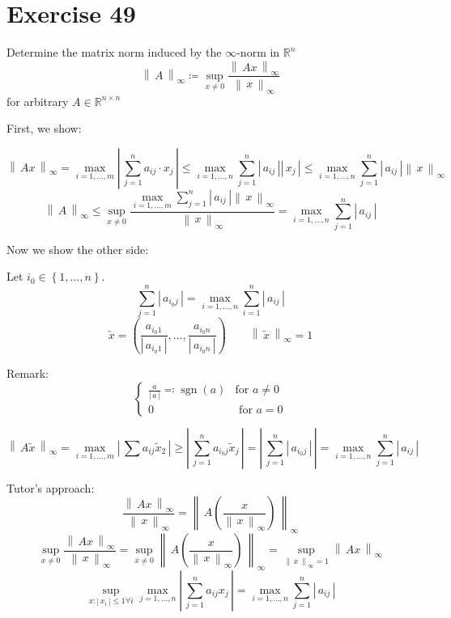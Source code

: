 \documentclass[a4paper]{article}
\theoremstyle{definition}
\newcommand\abs[1]{\left|\,#1\,\right|}
\newcommand\norm[1]{\left\|\,#1\,\right\|}
\newcommand\set[1]{\left\{#1\right\}}
\begin{document}
\section{Exercise 49}
\begin{ex}
  Determine the matrix norm induced by the $\infty$-norm in $\mathbb R^n$
  \[
  \norm{A}_\infty \coloneqq \sup_{x \neq 0} \frac{\norm{Ax}_\infty}{\norm{x}_\infty}
  \]
  for arbitrary $A \in \mathbb R^{n\times n}$
\end{ex}

First, we show:

\[
  \norm{Ax}_\infty = \max_{i = 1, \ldots, m} \abs{\sum_{j=1}^n a_{ij} \cdot x_j}
  \leq \max_{i=1,\ldots,n} \sum_{j=1}^n \abs{a_{ij}} \abs{x_j}
  \leq \max_{i=1,\ldots,n} \sum_{j=1}^n \abs{a_{ij}} \norm{x}_\infty
\]
\[ \norm{A}_\infty \leq \sup_{x\neq 0} \frac{\max_{i=1,\ldots,m} \sum_{j=1}^n \abs{a_{ij}} \norm{x}_\infty}{\norm{x}_\infty} = \max_{i=1,\ldots,n} \sum_{j=1}^n \abs{a_{ij}} \]

Now we show the other side:

Let $i_0 \in \set{1,\ldots,n}$.
\[ \sum_{j=1}^n \abs{a_{i_0 j}} = \max_{i=1,\ldots,n} \sum_{i=1}^n \abs{a_{ij}} \]
\[ \tilde{x} = \left(\frac{a_{i_0 1}}{\abs{a_{i_0 1}}}, \ldots, \frac{a_{i_0 n}}{\abs{a_{i_0 n}}}\right) \qquad \norm{\tilde{x}}_\infty = 1\]

Remark:
\[
\begin{cases}
  \frac{a}{\abs{a}} \eqqcolon \operatorname{sgn}(a) & \text{for } a \neq 0 \\
  0 & \text{ for } a = 0
\end{cases}
\]

\[ \norm{A \tilde{x}}_\infty = \max_{i=1,\ldots,m} \abs{\sum a_{ij} \tilde{x}_2} \geq \abs{\sum_{j=1}^n a_{i_0 j} \tilde{x}_j} = \abs{\sum_{j=1}^n \abs{a_{i_0 j}}} = \max_{i=1,\ldots,n} \sum_{j=1}^n \abs{a_{ij}} \]


Tutor's approach:
\[
\frac{\norm{Ax}_\infty}{\norm{x}_\infty} = \norm{A \left(\frac{x}{\norm{x}_\infty}\right)}_\infty
\] \[
\sup_{x\neq0} \frac{\norm{Ax}_\infty}{\norm{x}_\infty} = \sup_{x\neq 0} \norm{A \left(\frac{x}{\norm{x}_\infty}\right)}_\infty = \sup_{\norm{x}_\infty = 1} \norm{Ax}_\infty
\] \[
\sup_{x: \abs{x_i} \leq 1 \forall i} \max_{j=1,\ldots,n} \abs{\sum_{j=1}^n a_{ij} x_j} = \max_{i=1,\ldots,n} \sum_{j=1}^n \abs{a_{ij}}
\]
\end{document}
